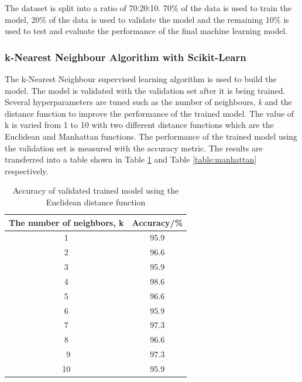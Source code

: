 The dataset is split into a ratio of 70:20:10. 70\% of the data is used to train the model, 20\% of the data is used to validate the model and the remaining 10\% is used to test and evaluate the performance of the final machine learning model. 

\subsubsection{k-Nearest Neighbour Algorithm with Scikit-Learn}
The k-Nearest Neighbour supervised learning algorithm is used to build the model. The model is validated with the validation set after it is being trained. Several hyperparameters are tuned such as the number of neighbours, \textit{k} and the distance function to improve the performance of the trained model. The value of k is varied from 1 to 10 with two different distance functions which are the Euclidean and Manhattan functions. The performance of the trained model using the validation set is measured with the accuracy metric. The results are transferred into a table shown in Table \ref{table:euclidean} and Table \ref{table:manhattan} respectively.

\begin{table}[ht]
\centering
\begin{center}
\begin{tabular}{ |c|c| } 
  \hline
 The number of neighbors, k  & Accuracy/\%\\ 
  \hline\hline
1 & 95.9\\ 
2 & 96.6\\ 
3 & 95.9\\ 
4 & 98.6\\ 
5 & 96.6\\ 
6 & 95.9\\ 
7 & 97.3\\ 
8 & 96.6\\\ 
9 & 97.3\\ 
10 & 95.9\\ 
\hline
\end{tabular}
\caption{Accuracy of validated trained model using the Euclidean distance function }
\label{table:euclidean}
\end{center}
\end{table}

